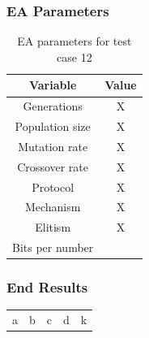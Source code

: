 \subsubsection{EA Parameters}\label{sec:test-case-12-parameters}
\begin{table}
	\begin{tabular}{c c}
		Variable & Value \\
		\hline
		Generations & X \\
		\hline
		Population size & X \\
		\hline
		Mutation rate & X \\
		\hline
		Crossover rate & X \\
		\hline
		Protocol & X \\
		\hline
		Mechanism & X \\
		\hline
		Elitism & X \\
		\hline
		Bits per number & \\
	\end{tabular}
	\caption{EA parameters for test case 12}
\end{table}
\subsubsection{End Results}\label{sec:test-case-12-results}
\begin{table}
	\begin{tabular}{c c c c c}
		a & b & c & d & k \\
	\end{tabular}
\end{table}
